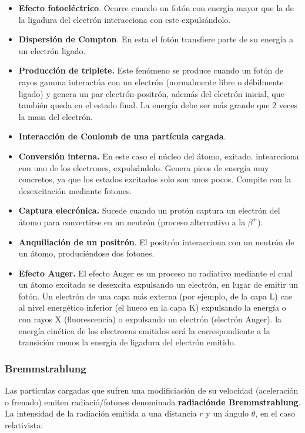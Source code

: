 \begin{itemize}
    \item \textbf{Efecto fotoeléctrico}. Ocurre cuando un fotón con energía mayor que la de la ligadura del electrón interacciona con este expulsándolo. 
    \item \textbf{Dispersión de Compton}. En esta el fotón transfiere parte de su energía a un electrón ligado. 
    \item \textbf{Producción de triplete.} Este fenómeno se produce cuando un fotón de rayos gamma interactúa con un electrón (normalmente libre o débilmente ligado) y genera un par electrón-positrón, además del electrón inicial, que también queda en el estado final. La energía debe ser más grande que 2 veces la masa del electrón.
    \item \textbf{Interacción de Coulomb de una partícula cargada}. 
    \item \textbf{Conversión interna.} En este caso el núcleo del átomo, exitado. intearcciona con uno de los electrones, expulsándolo. Genera picos de energía muy concretos, ya que los estados excitados solo son unos pocos. Compite con la desexcitación mediante fotones.
    \item \textbf{Captura elecrónica.} Sucede cuando un protón captura un electrón del átomo para convertirse en un neutrón (proceso alternativo a la $\beta^+$).
    \item \textbf{Anquiliación de un positrón}. El positrón interacciona con un neutrón de un átomo, produciéndose dos fotones.
    \item \textbf{Efecto Auger.} El efecto Auger es un proceso no radiativo mediante el cual un átomo excitado se desexcita expulsando un electrón, en lugar de emitir un fotón. Un electrón de una capa más externa (por ejemplo, de la capa L) cae al nivel energético inferior (el hueco en la capa K) expulsando la energía o con rayos X (fluorescencia) o expulsando un electrón (electrón Auger). la energía cinética de los electroens emitidos será la correspondiente a la transición menos la energía de ligadura del electrón emitido.
\end{itemize}

\subsubsection{Bremmstrahlung}

Las partículas cargadas que sufren una modificiación de su velocidad (aceleración o frenado) emiten radiació/fotones denominada \textbf{radiaciónde Bremmstrahlung}. La intensidad de la radiación emitida a una distancia $r$ y un ángulo $\theta$, en el caso relativista:

